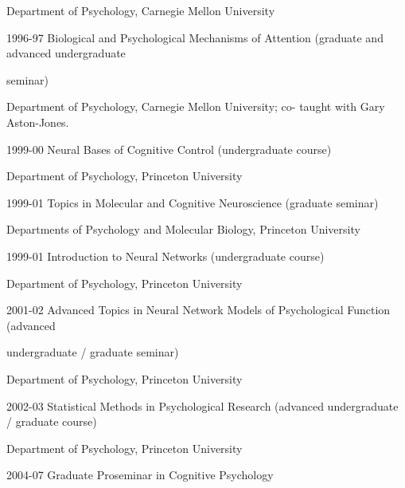 \documentclass[10 pt]{article}
\begin{document}
\hspace{0.81in} Department of Psychology, Carnegie Mellon University
    \smallskip

1996-97 \hspace{0.3in} Biological and Psychological Mechanisms of Attention (graduate and advanced undergraduate

\hspace{0.81in} seminar)

\hspace{0.81in} Department of Psychology, Carnegie Mellon University; co-
taught with Gary Aston-Jones.
    \smallskip

1999-00 \hspace{0.3in} Neural Bases of Cognitive Control (undergraduate course)

\hspace{0.81in} Department of Psychology, Princeton University
    \smallskip

1999-01 \hspace{0.3in} Topics in Molecular and Cognitive Neuroscience (graduate seminar)

\hspace{0.81in} Departments of Psychology and Molecular Biology, Princeton University
    \smallskip

1999-01 \hspace{0.3in} Introduction to Neural Networks (undergraduate course)

\hspace{0.81in} Department of Psychology, Princeton University
    \smallskip

2001-02 \hspace{0.3in} Advanced Topics in Neural Network Models of Psychological Function (advanced

\hspace{0.81in} undergraduate / graduate seminar)

\hspace{0.81in} Department of Psychology, Princeton University
    \smallskip

2002-03 \hspace{0.3in} Statistical Methods in Psychological Research (advanced undergraduate / graduate course)

\hspace{0.81in} Department of Psychology, Princeton University
    \smallskip

2004-07 \hspace{0.3in} Graduate Proseminar in Cognitive Psychology
\end{document}
